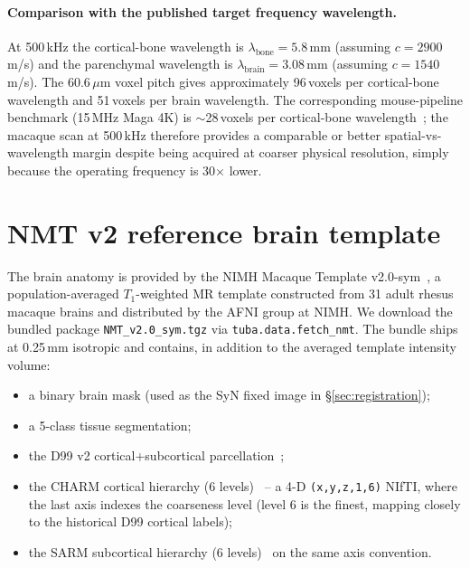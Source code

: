 \documentclass{compactarticle}
\begin{document}
\paragraph{Comparison with the published target frequency wavelength.}
At 500\,kHz the cortical-bone wavelength is
$\lambda_{\mathrm{bone}} = 5.8$\,mm (assuming $c = 2900$\,m/s) and the
parenchymal wavelength is $\lambda_{\mathrm{brain}} = 3.08$\,mm
(assuming $c = 1540$\,m/s). The 60.6\,$\mu$m voxel pitch gives
approximately 96\,voxels per cortical-bone wavelength and
51\,voxels per brain wavelength. The corresponding mouse-pipeline
benchmark (15\,MHz Maga 4K) is
$\sim$28\,voxels per cortical-bone wavelength~\cite{maga-validation};
the macaque scan at 500\,kHz therefore provides a comparable or better
spatial-vs-wavelength margin despite being acquired at coarser physical
resolution, simply because the operating frequency is 30$\times$ lower.

\section{NMT v2 reference brain template}
\label{sec:nmt}

The brain anatomy is provided by the NIMH Macaque Template
v2.0-sym~\cite{nmt-v2}, a population-averaged $T_1$-weighted MR
template constructed from 31 adult rhesus macaque brains and
distributed by the AFNI group at NIMH. We download the bundled
package \texttt{NMT\_v2.0\_sym.tgz} via
\texttt{tuba.data.fetch\_nmt}. The bundle
ships at 0.25\,mm isotropic and contains, in addition to the averaged
template intensity volume:
\begin{itemize}[leftmargin=*]
\setlength\itemsep{0pt}
  \item a binary brain mask (used as the SyN fixed image in
        \S\ref{sec:registration});
  \item a 5-class tissue segmentation;
  \item the D99 v2 cortical+subcortical parcellation~\cite{d99};
  \item the CHARM cortical hierarchy (6 levels)~\cite{charm} -- a 4-D
        \texttt{(x,y,z,1,6)} NIfTI, where the last axis indexes the
        coarseness level (level 6 is the finest, mapping closely to
        the historical D99 cortical labels);
  \item the SARM subcortical hierarchy (6 levels)~\cite{sarm} on the
        same axis convention.
\end{itemize}
\end{document}
